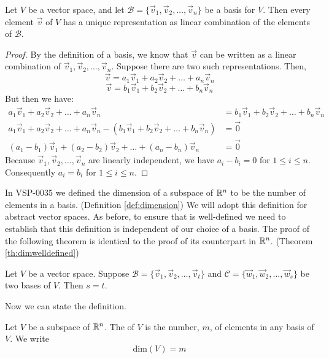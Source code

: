 \documentclass{ximera}
\begin{document}
\begin{theorem}\label{th:uniquerep}
Let $V$ be a vector space, and let $\mathcal{B}=\{\vec{v}_1, \vec{v}_2,\ldots,\vec{v}_n\}$ be a basis for $V$.  Then every element $\vec{v}$ of $V$ has a unique representation as linear combination of the elements of $\mathcal{B}$.
\end{theorem}
\begin{proof}
By the definition of a basis, we know that $\vec{v}$ can be written as a linear combination of $\vec{v}_1, \vec{v}_2,\ldots,\vec{v}_n$.  Suppose there are two such representations.  Then,
$$\vec{v}=a_1\vec{v}_1+ a_2\vec{v}_2+\ldots+a_n\vec{v}_n$$
$$\vec{v}=b_1\vec{v}_1+ b_2\vec{v}_2+\ldots+b_n\vec{v}_n$$
But then we have:
\begin{align*}
a_1\vec{v}_1+ a_2\vec{v}_2+\ldots+a_n\vec{v}_n&=b_1\vec{v}_1+ b_2\vec{v}_2+\ldots+b_n\vec{v}_n\\
a_1\vec{v}_1+ a_2\vec{v}_2+\ldots+a_n\vec{v}_n-(b_1\vec{v}_1+ b_2\vec{v}_2+\ldots+b_n\vec{v}_n)&=\vec{0}\\
(a_1-b_1)\vec{v}_1+ (a_2-b_2)\vec{v}_2+\ldots+(a_n-b_n)\vec{v}_n&=\vec{0}
\end{align*}
Because $\vec{v}_1, \vec{v}_2,\ldots,\vec{v}_n$ are linearly independent, we have $a_i-b_i=0$ for $1\leq i\leq n$. Consequently $a_i=b_i$ for $1\leq i\leq n$.
\end{proof}

In VSP-0035 we defined the dimension of a subspace of $\mathbb{R}^n$ to be the number of elements in a basis. (Definition \ref{def:dimension})  We will adopt this definition for abstract vector spaces.  As before, to ensure that  is well-defined we need to establish that this definition is independent of our choice of a basis.  The proof of the following theorem is identical to the proof of its counterpart in $\mathbb{R}^n$.  (Theorem \ref{th:dimwelldefined})

\begin{theorem}\label{th:dimwelldefinedabstract}
Let $V$ be a vector space.  Suppose $\mathcal{B}=\{\vec{v}_1, \vec{v}_2,\ldots ,\vec{v}_t\}$ and $\mathcal{C}=\{\vec{w}_1, \vec{w}_2,\ldots ,\vec{w}_s\}$ be two bases of $V$.  Then $s=t$.
\end{theorem}
Now we can state the definition.
\begin{definition}\label{def:dimensionabstract}
Let $V$ be a subspace of $\mathbb{R}^n$.  The  of $V$ is the number, $m$, of elements in any basis of $V$.  We write
$$\mbox{dim}(V)=m$$
\end{definition}
\end{document}
